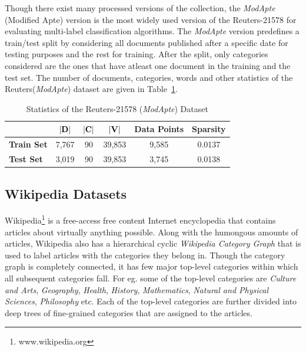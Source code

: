 Though there exist many processed versions of the collection, the \emph{ModApte} (Modified Apte) version is the most widely used version of the Reuters-21578 for evaluating multi-label classification algorithms. The \emph{ModApte} version predefines a train/test split by considering all documents published after a specific date for testing purposes and the rest for training. After the split, only categories considered are the ones that have atleast one document in the training and the test set. The number of documents, categories, words and other statistics of the Reuters(\emph{ModApte}) dataset are given in Table~\ref{reuter:data:stat}.

\begin{table}[h!]
\begin{center}
\begin{tabular}{l c c c c c} %
\toprule
& \textbf{$|\mathbf{D}|$} & \textbf{$|\mathbf{C}|$} & \textbf{$|\mathbf{V}|$} & \textbf{Data Points} & \textbf{Sparsity}\\
\midrule
\textbf{Train Set}	& 7,767 & 90 & 39,853 & 9,585 & 0.0137 \\
\textbf{Test Set}	& 3,019 & 90 & 39,853 & 3,745 & 0.0138 \\
\bottomrule         
\end{tabular}
\caption{\label{reuter:data:stat}Statistics of the Reuters-21578 (\emph{ModApte}) Dataset}
\end{center}
\end{table}

\subsection{Wikipedia Datasets}
Wikipedia\footnote{www.wikipedia.org} is a free-access free content Internet encyclopedia that contains articles about virtually anything possible. Along with the humongous amounts of articles, Wikipedia also has a hierarchical cyclic \emph{Wikipedia Category Graph} that is used to label articles with the categories they belong in. 
Though the category graph is completely connected, it has few major top-level categories within which all subsequent categories fall. For eg. some of the top-level categories are \emph{Culture and Arts}, \emph{Geography}, \emph{Health}, \emph{History}, \emph{Mathematics}, \emph{Natural and Physical Sciences}, \emph{Philosophy} etc. Each of the top-level categories are further divided into deep trees of fine-grained categories that are assigned to the articles. 


